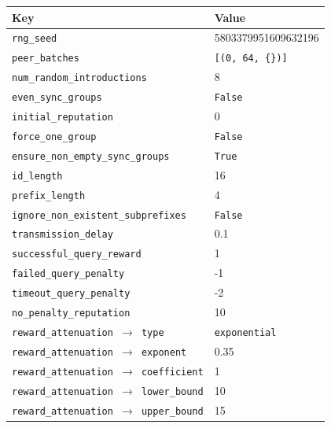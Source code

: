 \begin{longtable}{|l|l|}
\hline
\rowcolor{slightgray} \T Key & Value \B\\
\hline
\cellcolor{slightgray}\T \texttt{rng\_seed} & 5803379951609632196 \B\\
\hline
\cellcolor{slightgray}\T \texttt{peer\_batches} & \texttt{[(0, 64, \{\})]} \B\\
\hline
\cellcolor{slightgray}\T \texttt{num\_random\_introductions} & 8 \B\\
\hline
\cellcolor{slightgray}\T \texttt{even\_sync\_groups} & \texttt{False} \B\\
\hline
\cellcolor{slightgray}\T \texttt{initial\_reputation} & 0 \B\\
\hline
\cellcolor{slightgray}\T \texttt{force\_one\_group} & \texttt{False} \B\\
\hline
\cellcolor{slightgray}\T \texttt{ensure\_non\_empty\_sync\_groups} & \texttt{True} \B\\
\hline
\cellcolor{slightgray}\T \texttt{id\_length} & 16 \B\\
\hline
\cellcolor{slightgray}\T \texttt{prefix\_length} & 4 \B\\
\hline
\cellcolor{slightgray}\T \texttt{ignore\_non\_existent\_subprefixes} & \texttt{False} \B\\
\hline
\cellcolor{slightgray}\T \texttt{transmission\_delay} & 0.1 \B\\
\hline
\cellcolor{slightgray}\T \texttt{successful\_query\_reward} & 1 \B\\
\hline
\cellcolor{slightgray}\T \texttt{failed\_query\_penalty} & -1 \B\\
\hline
\cellcolor{slightgray}\T \texttt{timeout\_query\_penalty} & -2 \B\\
\hline
\cellcolor{slightgray}\T \texttt{no\_penalty\_reputation} & 10 \B\\
\hline
\cellcolor{slightgray}\T \texttt{reward\_attenuation $\rightarrow$ type} & \texttt{exponential} \B\\
\hline
\cellcolor{slightgray}\T \texttt{reward\_attenuation $\rightarrow$ exponent} & 0.35 \B\\
\hline
\cellcolor{slightgray}\T \texttt{reward\_attenuation $\rightarrow$ coefficient} & 1 \B\\
\hline
\cellcolor{slightgray}\T \texttt{reward\_attenuation $\rightarrow$ lower\_bound} & 10 \B\\
\hline
\cellcolor{slightgray}\T \texttt{reward\_attenuation $\rightarrow$ upper\_bound} & 15 \B\\

\end{longtable}
